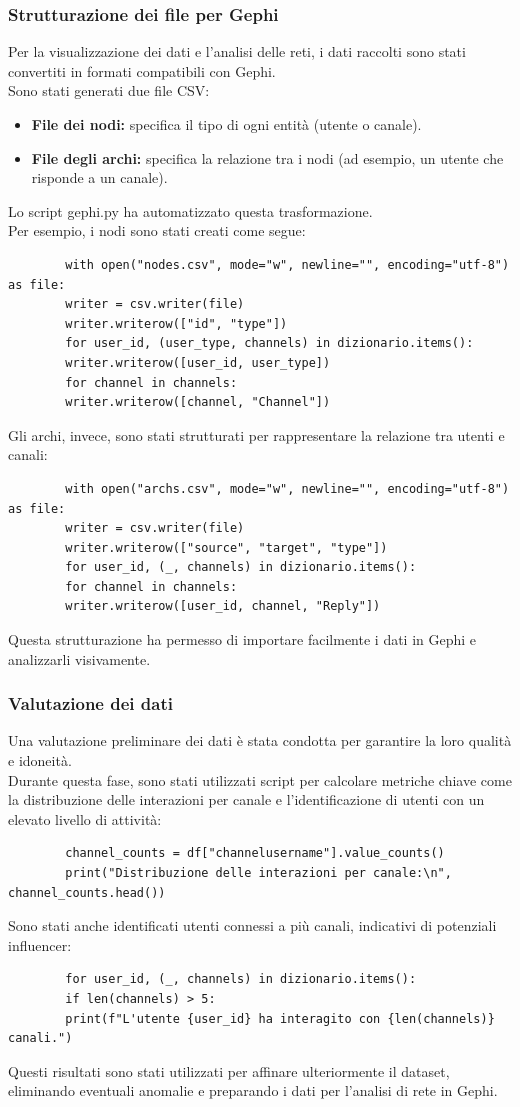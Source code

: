 \documentclass[12pt]{article}
\begin{document}
	\subsubsection{Strutturazione dei file per Gephi}
	Per la visualizzazione dei dati e l'analisi delle reti, i dati raccolti sono stati convertiti in formati compatibili con Gephi.\\
	Sono stati generati due file CSV:
	\begin{itemize}[label=] 
		\item \textbf{File dei nodi:} specifica il tipo di ogni entità (utente o canale).
		\item \textbf{File degli archi:} specifica la relazione tra i nodi (ad esempio, un utente che risponde a un canale).
	\end{itemize}
	Lo script gephi.py ha automatizzato questa trasformazione. 
	\\Per esempio, i nodi sono stati creati come segue:
	\begin{lstlisting}
		with open("nodes.csv", mode="w", newline="", encoding="utf-8") as file:
		writer = csv.writer(file)
		writer.writerow(["id", "type"])
		for user_id, (user_type, channels) in dizionario.items():
		writer.writerow([user_id, user_type])
		for channel in channels:
		writer.writerow([channel, "Channel"])
	\end{lstlisting}
	Gli archi, invece, sono stati strutturati per rappresentare la relazione tra utenti e canali:
	\begin{lstlisting}
		with open("archs.csv", mode="w", newline="", encoding="utf-8") as file:
		writer = csv.writer(file)
		writer.writerow(["source", "target", "type"])
		for user_id, (_, channels) in dizionario.items():
		for channel in channels:
		writer.writerow([user_id, channel, "Reply"])
	\end{lstlisting}
	Questa strutturazione ha permesso di importare facilmente i dati in Gephi e analizzarli visivamente.
	\subsubsection{Valutazione dei dati}
	Una valutazione preliminare dei dati è stata condotta per garantire la loro qualità e idoneità.\\ 
	Durante questa fase, sono stati utilizzati script per calcolare metriche chiave come la distribuzione delle interazioni per canale e l'identificazione di utenti con un elevato livello di attività:
	\begin{lstlisting}
		channel_counts = df["channelusername"].value_counts()
		print("Distribuzione delle interazioni per canale:\n", channel_counts.head())
	\end{lstlisting}
	Sono stati anche identificati utenti connessi a più canali, indicativi di potenziali influencer:
	\begin{lstlisting}
		for user_id, (_, channels) in dizionario.items():
		if len(channels) > 5:
		print(f"L'utente {user_id} ha interagito con {len(channels)} canali.")
	\end{lstlisting}
	Questi risultati sono stati utilizzati per affinare ulteriormente il dataset, eliminando eventuali anomalie e preparando i dati per l'analisi di rete in Gephi.
\end{document}
